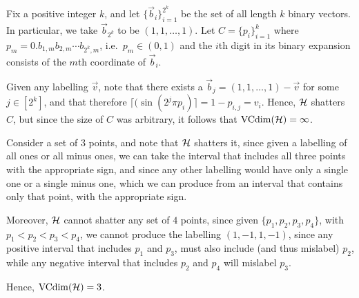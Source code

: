 \begin{ex}
  Fix a positive integer $k$, and let $\{\vec{b}_i\}_{i=1}^{2^k}$ be the set
  of all length $k$ binary vectors. In particular, we take $\vec{b}_{2^k}$ to be
  $(1,1,\ldots,1)$. Let $C=\{p_i\}_{i=1}^k$ where
  $p_m=0.b_{1,m}b_{2,m}\cdots b_{2^k,m}$, i.e.\ $p_m\in(0,1)$ and the
  $i$th digit in its binary expansion consists of the $m$th coordinate of
  $\vec{b}_i$.

  Given any labelling $\vec{v}$, note that there exists a
  $\vec{b}_j=(1,1,\ldots,1)-\vec{v}$ for some $j\in [2^k]$, and that therefore
  $\lceil(\sin(2^j\pi p_i) \rceil = 1 - p_{i,j}=v_i$. Hence, $\mathcal{H}$ shatters $C$,
  but since the size of $C$ was arbitrary, it follows that $\operatorname{VCdim}(\mathcal{H})=\infty$.
\end{ex}

\begin{ex}
  Consider a set of $3$ points, and note that $\mathcal{H}$ shatters it, since given a
  labelling of all ones or all minus ones, we can take the interval that
  includes all three points with the appropriate sign, and since any other
  labelling would have only a single one or a single minus one, which we can
  produce from an interval that contains only that point, with the appropriate
  sign.

  Moreover, $\mathcal{H}$ cannot shatter any set of $4$ points, since given
  $\{p_1,p_2,p_3,p_4\}$, with $p_1<p_2<p_3<p_4$, we cannot produce the labelling
  $(1,-1,1,-1)$, since any positive interval that includes $p_1$ and $p_3$, must
  also include (and thus mislabel) $p_2$, while any negative interval that
  includes $p_2$ and $p_4$ will mislabel $p_3$.

  Hence, $\operatorname{VCdim}(\mathcal{H})=3$.
\end{ex}

\begin{ex}
\end{ex}

\begin{ex}
\end{ex}

